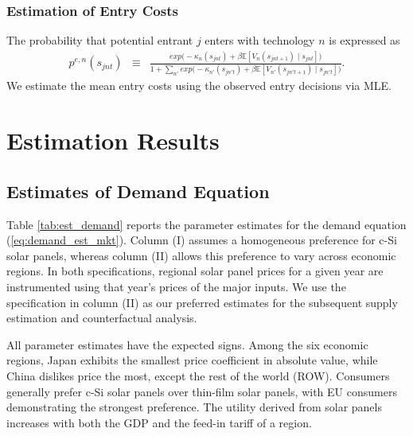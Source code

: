 \documentclass[12pt, letter]{article}
\begin{document}

\subsubsection{Estimation of Entry Costs}
The probability that potential entrant $j$ enters with technology $n$ is expressed as
\begin{eqnarray}
  p^{e,n}(s_{jnt}) & \equiv & \frac{exp\Big(-\kappa_n(s_{jnt}) + \beta \mathbb{E}[V_n(s_{jnt+1}) \mid s_{jnt}] \Big)}{1 + \sum_{n'} exp\Big(-\kappa_{n'}(s_{jn't}) + \beta \mathbb{E}[V_{n'}(s_{jn't+1}) \mid s_{jn't}]\Big)}. %
\end{eqnarray}
We estimate the mean entry costs using the observed entry decisions via MLE.

\section{Estimation Results}
\label{sec:est_results}

\subsection{Estimates of Demand Equation}
\label{subsec:est_results_demand}

Table \ref{tab:est_demand} reports the parameter estimates for the demand equation (\ref{eq:demand_est_mkt}). Column (I) assumes a homogeneous preference for c-Si solar panels, whereas column (II) allows this preference to vary across economic regions. In both specifications, regional solar panel prices for a given year are instrumented using that year’s prices of the major inputs. We use the specification in column (II) as our preferred estimates for the subsequent supply estimation and counterfactual analysis.

All parameter estimates have the expected signs. Among the six economic regions, Japan exhibits the smallest price coefficient in absolute value, while China dislikes price the most, except the rest of the world (ROW). 
Consumers generally prefer c-Si solar panels over thin-film solar panels, with EU consumers demonstrating the strongest preference. The utility derived from solar panels increases with both the GDP and the feed-in tariff of a region.
\end{document}
